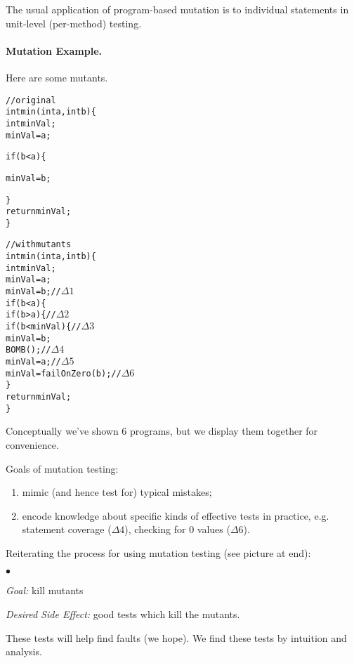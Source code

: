 \documentclass[11pt]{article}
\newcommand{\squishlist}{
 \begin{list}{$\bullet$}
  { \setlength{\itemsep}{0pt}
     \setlength{\parsep}{3pt}
     \setlength{\topsep}{3pt}
     \setlength{\partopsep}{0pt}
     \setlength{\leftmargin}{1.5em}
     \setlength{\labelwidth}{1em}
     \setlength{\labelsep}{0.5em} } }
\newcommand{\squishend}{
  \end{list}  }
\begin{document}
The usual application of program-based mutation is to individual statements
in unit-level (per-method) testing.

\paragraph{Mutation Example.} Here are some mutants.

{\small
\begin{minipage}[t]{.5\textwidth}
\begin{alltt}
// original
int min(int a, int b) \{
  int minVal;
  minVal = a;

  if (b < a) \{


    minVal = b;



  \}
  return minVal;
\}
\end{alltt}
\end{minipage} \begin{minipage}[t]{.5\textwidth}
\begin{alltt}
// with mutants
int min(int a, int b) \{
  int minVal;
  minVal = a;
  minVal = b;               // \(\Delta 1\)
  if (b < a) \{
  if (b > a) \{              // \(\Delta 2\)
  if (b < minVal) \{         // \(\Delta 3 \)
    minVal = b;
    BOMB();                 // \(\Delta 4\)
    minVal = a;             // \(\Delta 5\)
    minVal = failOnZero(b); // \(\Delta 6\)
  \}
  return minVal;
\}
\end{alltt}
\end{minipage}
}

Conceptually we've shown 6 programs, but we display them together for 
convenience.

Goals of mutation testing:
\begin{enumerate}
\item mimic (and hence test for) typical mistakes;
\item encode knowledge about specific kinds of effective tests in practice, e.g.
statement coverage ($\Delta 4$), checking for 0 values ($\Delta 6$).
\end{enumerate}

Reiterating the process for using mutation testing (see picture at end):
\squishlist
\item \emph{Goal:} kill mutants
\item \emph{Desired Side Effect:} good tests which kill the mutants.
\squishend
These tests will help find faults (we hope). We find these tests by
intuition and analysis.
\end{document}
